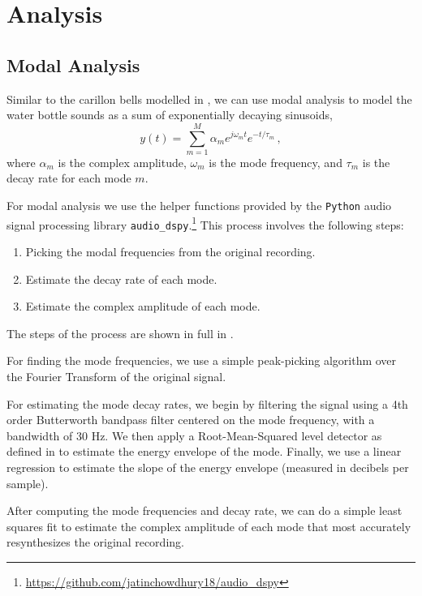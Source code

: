 \documentclass[twoside,a4paper]{article}
\begin{document}
\section{Analysis} \label{sec:analysis}


\subsection{Modal Analysis} \label{sec:modal-analysis}
%
Similar to the carillon bells modelled in \cite{canfielddafilou:werner:bellEffects:2017,rau:das:canfielddafilou:carillon:2019},
we can use modal analysis to model the water bottle sounds as
a sum of exponentially decaying sinusoids,
\begin{equation}
    y(t) = \sum_{m=1}^M \alpha_m e^{j\omega_m t} e^{-t/\tau_m} \,,
    \label{eq:modal-def}
\end{equation}
%
where $\alpha_m$ is the complex amplitude, $\omega_m$ is the mode
frequency, and $\tau_m$ is the decay rate for each mode $m$.

For modal analysis we use the helper functions
provided by the \texttt{Python} audio signal processing library
\texttt{audio\_dspy}.\footnote{\url{https://github.com/jatinchowdhury18/audio_dspy}}
This process involves the following steps:
\begin{enumerate}
    \item Picking the modal frequencies from the original recording.
    \item Estimate the decay rate of each mode.
    \item Estimate the complex amplitude of each mode.
\end{enumerate}
%
The steps of the process are shown in  full in .

For finding the mode frequencies, we use a simple peak-picking
algorithm over the Fourier Transform of the original signal.

For estimating the mode decay rates, we begin by filtering
the signal using a 4th order Butterworth bandpass filter
centered on the mode frequency, with a bandwidth of 30 Hz.
We then apply a Root-Mean-Squared level detector as defined
in \cite{giannoulis2012compressor} to estimate the energy
envelope of the mode. Finally, we use a linear regression
to estimate the slope of the energy envelope (measured in
decibels per sample).

After computing the mode frequencies and decay
rate, we can do a simple least squares fit to
estimate the complex amplitude of each mode that
most accurately resynthesizes the original recording.
\end{document}

